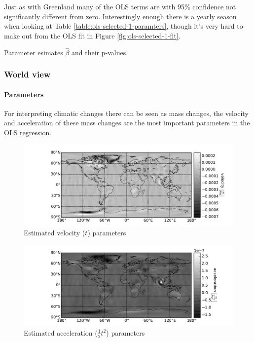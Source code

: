 Just as with Greenland many of the OLS terms are with 95\% confidence not significantly different from zero. Interestingly enough there is a yearly season when looking at Table \ref{table:ols-selected-1-paramters}, though it's very hard to make out from the OLS fit in Figure \ref{fig:ols-selected-1-fit}.

\begin{table}[H]
\centering
\centerline{}
\caption{Parameter esimates $\hat{\beta}$ and their p-values. }
\label{table:ols-selected-1-paramters}
\end{table}

\pagebreak
\subsubsection{World view}

\paragraph{Parameters}

For interpreting climatic changes there can be seen as mass changes, the velocity and acceleration of these mass changes are the most important parameters in the OLS regression.
\begin{figure}[H]
	\centering
	\includegraphics[width=\textwidth]{figures/ols-world-parameter-vel}
	\caption{Estimated velocity ($t$) parameters}
	\label{fig:ols-world-parameter-vel}
\end{figure}

\begin{figure}[H]
	\centering
	\includegraphics[width=\textwidth]{figures/ols-world-parameter-acc}
	\caption{Estimated acceleration ($\frac{1}{2} t^2$) parameters}
	\label{fig:ols-world-parameter-acc}
\end{figure}

